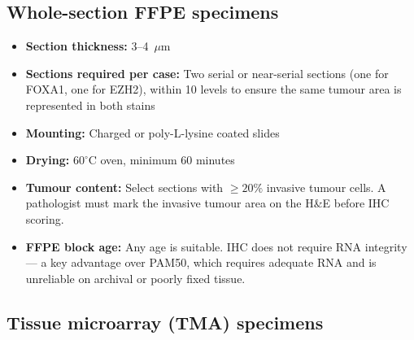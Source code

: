 \documentclass[11pt, a4paper]{article}
\begin{document}
\subsection{Whole-section FFPE specimens}

\begin{itemize}
    \item \textbf{Section thickness:}
    3--4~$\mu$m
    \item \textbf{Sections required per case:}
    Two serial or near-serial sections
    (one for FOXA1, one for EZH2), within
    10 levels to ensure the same tumour
    area is represented in both stains
    \item \textbf{Mounting:}
    Charged or poly-L-lysine coated slides
    \item \textbf{Drying:}
    $60^\circ$C oven, minimum 60 minutes
    \item \textbf{Tumour content:}
    Select sections with $\geq 20\%$
    invasive tumour cells. A pathologist
    must mark the invasive tumour area on
    the H\&E before IHC scoring.
    \item \textbf{FFPE block age:}
    Any age is suitable. IHC does not
    require RNA integrity --- a key
    advantage over PAM50, which requires
    adequate RNA and is unreliable on
    archival or poorly fixed tissue.
\end{itemize}

\subsection{Tissue microarray (TMA) specimens}
\label{sec:tma}
\end{document}
